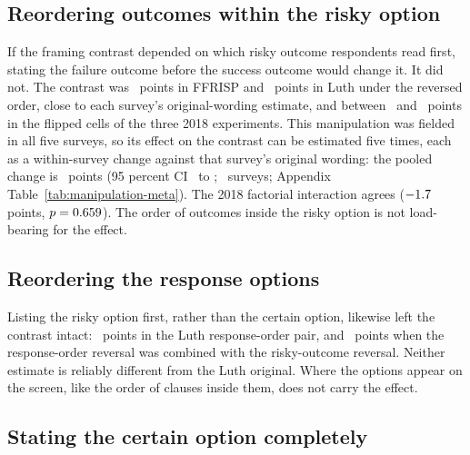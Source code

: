 \documentclass[11pt]{article}
\begin{document}
\subsection{Reordering outcomes within the risky option}

If the framing contrast depended on which risky outcome respondents read first, stating the failure outcome before the success outcome would change it. It did not. The contrast was \FFRArmRiskyFlipEffect\ points in FFRISP and \LuthArmRiskyFlipEffect\ points in Luth under the reversed order, close to each survey's original-wording estimate, and between \ProtzkoFlipMin\ and \ProtzkoFlipMax\ points in the flipped cells of the three 2018 experiments. This manipulation was fielded in all five surveys, so its effect on the contrast can be estimated five times, each as a within-survey change against that survey's original wording: the pooled change is \FlipChangeEffect\ points (95 percent CI \FlipChangeLow\ to \FlipChangeHigh; \FlipChangeK\ surveys; Appendix Table~\ref{tab:manipulation-meta}). The 2018 factorial interaction agrees ($-1.7$ points, $p=0.659$). The order of outcomes inside the risky option is not load-bearing for the effect.

\subsection{Reordering the response options}

Listing the risky option first, rather than the certain option, likewise left the contrast intact: \LuthArmResponseOrderEffect\ points in the Luth response-order pair, and \LuthArmRiskyResponseEffect\ points when the response-order reversal was combined with the risky-outcome reversal. Neither estimate is reliably different from the Luth original. Where the options appear on the screen, like the order of clauses inside them, does not carry the effect.

\subsection{Stating the certain option completely}
\end{document}
